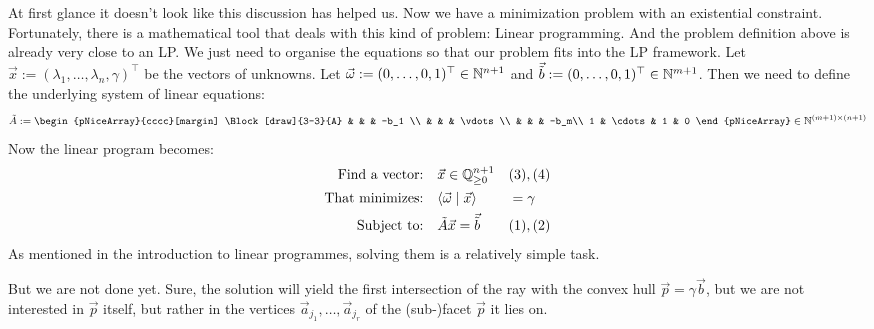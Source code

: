 At first glance it doesn't look like this discussion has helped us. Now we have a minimization problem with an existential constraint. Fortunately, there is a mathematical tool that deals with this kind of problem: Linear programming. And the problem definition above is already very close to an LP. We just need to organise the equations so that our problem fits into the LP framework. Let $\vec x := (\lambda_1, \dots, \lambda_n, \gamma)^\top$ be the vectors of unknowns. Let $\vec\omega := (0, \dots, 0, 1)^\top \in \mathbb{N}^{n+1}$ and $\vec{\tilde b} := (0, \dots, 0, 1)^\top \in \mathbb{N}^{m+1}$. Then we need to define the underlying system of linear equations:
$$\tilde A :=
\begin{pNiceArray}{cccc}[margin] 
\Block[draw]{3-3}{A} & & & -b_1 \\
& & & \vdots\\
& & & -b_m\\
1 & \cdots  & 1 & 0 
\end{pNiceArray} \in \N^{(m+1) \times (n+1)}$$
Now the linear program becomes:
\begin{align*}
    \text{Find a vector:} & \quad \vec x \in \mathbb{Q}^{n+1}_{\geq 0} &&(3), (4)\\
    \text{That minimizes:} & \quad \langle \vec \omega \mid \vec x \rangle &&=\gamma\\
    \text{Subject to:} & \quad \tilde A\vec x = \vec{\tilde b} &&(1), (2)
\end{align*}
As mentioned in the introduction to linear programmes, solving them is a relatively simple task.

But we are not done yet. Sure, the solution will yield the first intersection of the ray with the convex hull $\vec p = \gamma\vec b$, but we are not interested in $\vec p$ itself, but rather in the vertices $\vec a_{j_1}, \dots, \vec a_{j_r}$ of the (sub-)facet $\vec p$ it lies on. 


